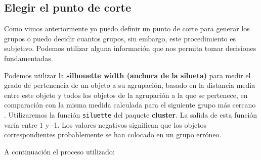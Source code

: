\documentclass[]{book}
\begin{document}
\subsection{Elegir el punto de corte}\label{elegir-el-punto-de-corte}

Como vimos anteriormente yo puedo definir un punto de corte para generar
los grupos o puedo decidir cuantos grupos, sin embargo, este
procedimiento es subjetivo. Podemos utilizar alguna información que nos
permita tomar decisiones fundamentadas.

Podemos utilizar la \textbf{silhouette width (anchura de la silueta)}
para medir el grado de pertenencia de un objeto a su agrupación, basado
en la distancia media entre este objeto y todos los objetos de la
agrupación a la que se pertenece, en comparación con la misma medida
calculada para el siguiente grupo más cercano \citep{Borcard2011}.
Utilizaremos la función \texttt{siluette} del paquete \textbf{cluster}.
La salida de esta función varía entre 1 y -1. Los valores negativos
significan que los objetos correspondientes probablemente se han
colocado en un grupo erróneo.

A continuación el proceso utilizado:
\end{document}
